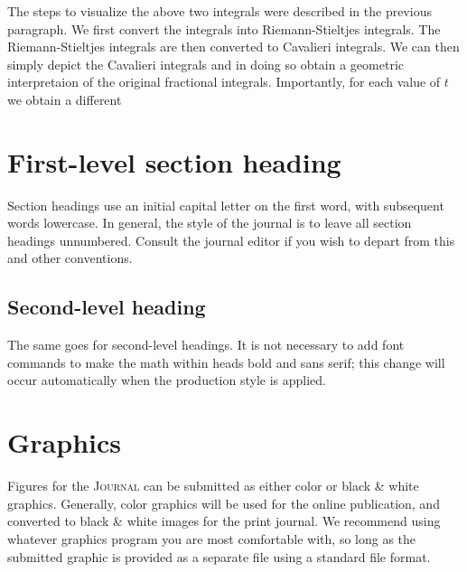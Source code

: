 \documentclass{article}
\theoremstyle{theorem}
\theoremstyle{definition}
\begin{document}
The steps to visualize the above two integrals were described in the previous paragraph. We first convert the integrals into Riemann-Stieltjes integrals. The 
Riemann-Stieltjes integrals are then converted to Cavalieri integrals. We can then simply depict the Cavalieri integrals and in doing so obtain a geometric interpretaion
of the original fractional integrals. Importantly, for each value of $t$ we obtain a different 








\section{First-level section heading}

Section headings use an initial capital letter on the first word, with subsequent words lowercase.  In general, the style of the journal is to leave all section headings unnumbered.  Consult the journal editor if you wish to depart from this and other conventions.

\subsection{Second-level heading}

The same goes for second-level headings.  It is not necessary to add font commands to make the math within heads bold and sans serif; this change will occur automatically when the production style is applied.

\section{Graphics}

Figures for the \textsc{Journal} can be submitted as either color or black \& white graphics.  Generally, color graphics will be used for the online publication, and converted to black \& white images for the print journal.  We recommend using whatever graphics program you are most comfortable with, so long as the submitted graphic is provided as a separate file using a standard file format.
\end{document}
